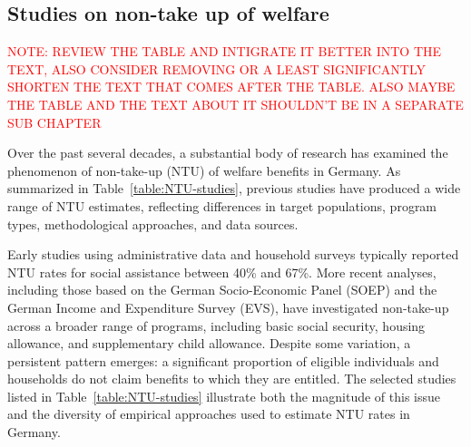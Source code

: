 \subsection{Studies on non-take up of welfare}

\textcolor{red}{NOTE: REVIEW THE TABLE AND INTIGRATE IT BETTER INTO THE TEXT, ALSO CONSIDER REMOVING OR A LEAST SIGNIFICANTLY SHORTEN THE TEXT THAT COMES AFTER THE TABLE. ALSO MAYBE THE TABLE AND THE TEXT ABOUT IT SHOULDN'T BE IN A SEPARATE SUB CHAPTER}

Over the past several decades, a substantial body of research has examined the phenomenon of non-take-up (NTU) of welfare benefits in Germany. 
As summarized in Table~\ref{table:NTU-studies}, previous studies have produced a wide range of NTU estimates, reflecting differences in target populations, program types, methodological approaches, and data sources. 

Early studies using administrative data and household surveys typically reported NTU rates for social assistance between 40\% and 67\%. 
More recent analyses, including those based on the German Socio-Economic Panel (SOEP) and the German Income and Expenditure Survey (EVS), have investigated non-take-up across a broader range of programs, including basic social security, housing allowance, and supplementary child allowance. 
Despite some variation, a persistent pattern emerges: a significant proportion of eligible individuals and households do not claim benefits to which they are entitled. 
The selected studies listed in Table~\ref{table:NTU-studies} illustrate both the magnitude of this issue and the diversity of empirical approaches used to estimate NTU rates in Germany.

